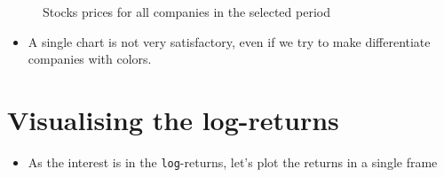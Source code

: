 \documentclass[
  12pt]{article}
\providecommand{\tightlist}{%
  \setlength{\itemsep}{0pt}\setlength{\parskip}{0pt}}\usepackage{longtable,booktabs,array}
\theoremstyle{definition}
\theoremstyle{remark}
\begin{document}
\begin{figure}[H]


\caption{\label{fig-all-stocks}Stocks prices for all companies in the
selected period}

\end{figure}%

\begin{itemize}
\tightlist
\item
  A single chart is not very satisfactory, even if we try to make
  differentiate companies with colors.
\end{itemize}

\section{Visualising the log-returns}\label{visualising-the-log-returns}

\begin{itemize}
\tightlist
\item
  As the interest is in the \texttt{log}-returns, let's plot the returns
  in a single frame
\end{itemize}
\end{document}
